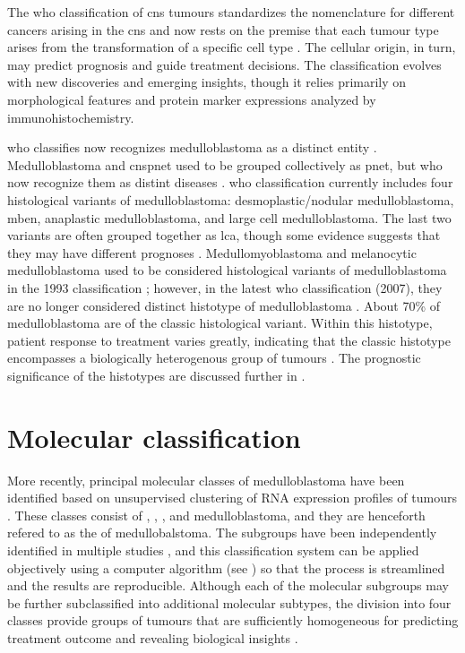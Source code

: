 The \gls{who} classification of \gls{cns} tumours standardizes the nomenclature for different cancers arising in the \gls{cns} and now rests on the premise that each tumour type arises from the transformation of a specific cell type . The cellular origin, in turn, may predict prognosis and guide treatment decisions. The classification evolves with new discoveries and emerging insights, though it relies primarily on morphological features and protein marker expressions analyzed by immunohistochemistry.

\gls{who} classifies now recognizes medulloblastoma as a distinct entity . Medulloblastoma and \gls{cnspnet} used to be grouped collectively as \gls{pnet}, but \gls{who} now recognize them as distint diseases . \gls{who} classification currently includes four histological variants of medulloblastoma: desmoplastic/nodular medulloblastoma, \gls{mben}, anaplastic medulloblastoma, and large cell medulloblastoma. The last two variants are often grouped together as \gls{lca}, though some evidence suggests that they may have different prognoses . Medullomyoblastoma and melanocytic medulloblastoma used to be considered histological variants of medulloblastoma in the 1993 classification ; however, in the latest \gls{who} classification (2007), they are no longer considered distinct histotype of medulloblastoma . About 70\% of medulloblastoma are of the classic histological variant. Within this histotype, patient response to treatment varies greatly, indicating that the classic histotype encompasses a biologically heterogenous group of tumours . The prognostic significance of the histotypes are discussed further in .



\section{Molecular classification}

More recently, principal molecular classes of medulloblastoma have been identified based on unsupervised clustering of RNA expression profiles of tumours . These classes consist of , , , and  medulloblastoma, and they are henceforth refered to as the  of medullobalstoma. The subgroups have been independently identified in multiple studies , and this classification system can be applied objectively using a computer algorithm (see ) so that the process is streamlined and the results are reproducible. Although each of the molecular subgroups may be further subclassified into additional molecular subtypes, the division into four classes provide groups of tumours that are sufficiently homogeneous for predicting treatment outcome and revealing biological insights .

